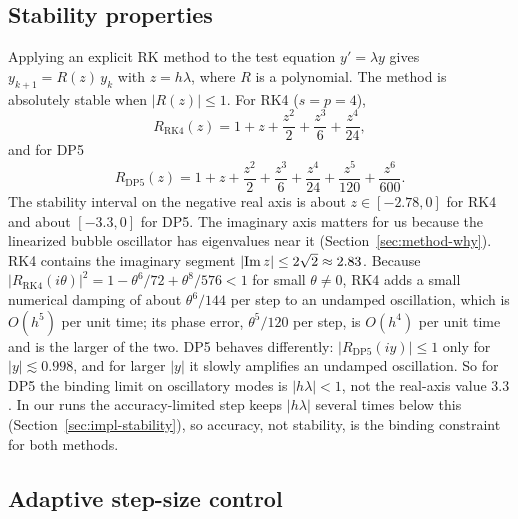 \subsection{Stability properties}
\label{sec:method-stability}

Applying an explicit RK method to the test equation $y'=\lambda y$ gives $y_{k+1}=R(z)\,y_k$ with $z=h\lambda$, where $R$ is a polynomial. The method is absolutely stable when $|R(z)|\le1$. For RK4 ($s=p=4$),
\begin{equation}
R_{\mathrm{RK4}}(z)=1+z+\frac{z^2}{2}+\frac{z^3}{6}+\frac{z^4}{24},
\end{equation}
and for DP5
\begin{equation}
R_{\mathrm{DP5}}(z)=1+z+\frac{z^2}{2}+\frac{z^3}{6}+\frac{z^4}{24}+\frac{z^5}{120}+\frac{z^6}{600}.
\end{equation}
The stability interval on the negative real axis is about $z\in[-2.78,0]$ for RK4 and about $[-3.3,0]$ for DP5. The imaginary axis matters for us because the linearized bubble oscillator has eigenvalues near it (Section~\ref{sec:method-why}). RK4 contains the imaginary segment $|{\rm Im}\,z|\le2\sqrt2\approx2.83$. Because $|R_{\mathrm{RK4}}(i\theta)|^2=1-\theta^6/72+\theta^8/576<1$ for small $\theta\neq0$, RK4 adds a small numerical damping of about $\theta^6/144$ per step to an undamped oscillation, which is $O(h^5)$ per unit time; its phase error, $\theta^5/120$ per step, is $O(h^4)$ per unit time and is the larger of the two. DP5 behaves differently: $|R_{\mathrm{DP5}}(iy)|\le1$ only for $|y|\lesssim0.998$, and for larger $|y|$ it slowly amplifies an undamped oscillation. So for DP5 the binding limit on oscillatory modes is $|h\lambda|<1$, not the real-axis value $3.3$. In our runs the accuracy-limited step keeps $|h\lambda|$ several times below this (Section~\ref{sec:impl-stability}), so accuracy, not stability, is the binding constraint for both methods.

\subsection{Adaptive step-size control}
\label{sec:method-adaptive}

